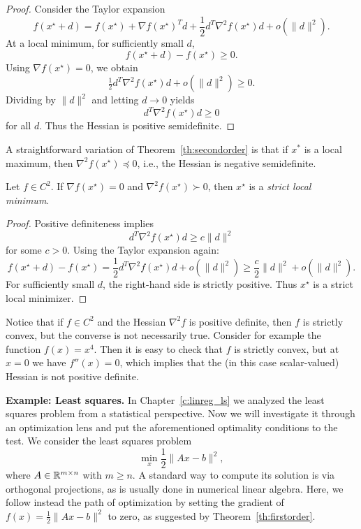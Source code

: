 \begin{proof}
Consider the Taylor expansion
$$
f(x^\star + d) = f(x^\star) + \nabla f(x^\star)^T d +
 \frac{1}{2} d^T \nabla^2 f(x^\star) d + o(\|d\|^2).
$$
At a local minimum, for sufficiently small $d$,
$$
f(x^\star+d)-f(x^\star) \ge 0.
$$
Using $\nabla f(x^\star)=0$, we obtain
$$
\tfrac12 d^T \nabla^2 f(x^\star) d + o(\|d\|^2) \ge 0.
$$
Dividing by $\|d\|^2$ and letting $d\to 0$ yields
$$
d^T \nabla^2 f(x^\star) d \ge 0
$$
for all $d$. Thus the Hessian is positive semidefinite.

\end{proof}

A straightforward variation of Theorem~\ref{th:secondorder} is that if $x^*$ is a local maximum, then $\nabla^2 f(x^\star)\preceq 0$, i.e., the Hessian is negative semidefinite.


\begin{theorem}\label{th:hessian}
Let $f\in C^2$. If $\nabla f(x^\star)=0$ and $\nabla^2 f(x^\star)\succ 0$, then $x^\star$ is a {\em strict local minimum}.
\end{theorem}

\begin{proof}
Positive definiteness implies
$$
d^T \nabla^2 f(x^\star) d \ge c\|d\|^2
$$
for some $c>0$. Using the Taylor expansion again:
$$
f(x^\star+d)-f(x^\star)
= \frac{1}{2} d^T \nabla^2 f(x^\star) d + o(\|d\|^2)
\ge \frac{c}{2}\|d\|^2 + o(\|d\|^2).
$$
For sufficiently small $d$, the right-hand side is strictly positive. Thus $x^\star$ is a strict local minimizer. 
\end{proof}


Notice that if  $f\in C^2$ and the Hessian $\nabla^2 f$ is positive definite, then $f$ is strictly convex, but the converse is not necessarily true. Consider for example the function $f(x)=x^4$. Then it is easy to check that $f$ is strictly convex, but at $x=0$ we have $f''(x) =0$, which implies that the (in this case scalar-valued) Hessian is not positive definite.

\medskip
\noindent
\textbf{Example: Least squares.} In Chapter~\ref{c:linreg_ls} we analyzed the least squares problem from a statistical perspective. Now we will investigate it through an optimization lens and put the aforementioned optimality conditions to the test. We consider the least squares problem
\begin{equation}\label{optim:lsq}
    \min_x \frac{1}{2} \|Ax - b\|^2,
\end{equation}
where $A \in \mathbb{R}^{m \times n}$ with $m \ge n$.
A standard way to compute its solution
is via orthogonal projections, as is usually done in numerical linear algebra. Here, we follow instead the path of optimization by setting the gradient of $f(x)=\frac{1}{2} \|Ax - b\|^2$ to zero, as suggested by Theorem~\ref{th:firstorder}. 


